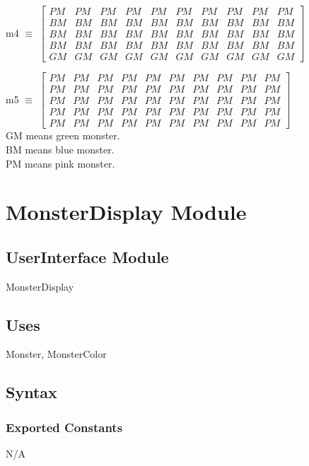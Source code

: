 \documentclass[12pt]{article}
\begin{document}
\vspace{1cm}
\noindent 
m4 $\equiv$ 
$
\begin{bmatrix}
PM & PM & PM & PM & PM & PM & PM & PM & PM & PM \\
BM & BM & BM & BM & BM & BM & BM & BM & BM & BM \\
BM & BM & BM & BM & BM & BM & BM & BM & BM & BM \\
BM & BM & BM & BM & BM & BM & BM & BM & BM & BM \\
GM & GM & GM & GM & GM & GM & GM & GM & GM & GM 
\end{bmatrix}
$

\vspace{1cm}
\noindent 
m5 $\equiv$ 
$
\begin{bmatrix}
PM & PM & PM & PM & PM & PM & PM & PM & PM & PM \\
PM & PM & PM & PM & PM & PM & PM & PM & PM & PM \\
PM & PM & PM & PM & PM & PM & PM & PM & PM & PM \\
PM & PM & PM & PM & PM & PM & PM & PM & PM & PM \\
PM & PM & PM & PM & PM & PM & PM & PM & PM & PM 
\end{bmatrix}
$
\\

\noindent GM means green monster.\\ BM means blue monster.\\ PM means pink monster.
\newpage


\section{MonsterDisplay Module}

\subsection*{UserInterface Module}
MonsterDisplay
\subsection*{Uses}
Monster, MonsterColor

\subsection*{Syntax}
\subsubsection*{Exported Constants}
N/A
\end{document}
